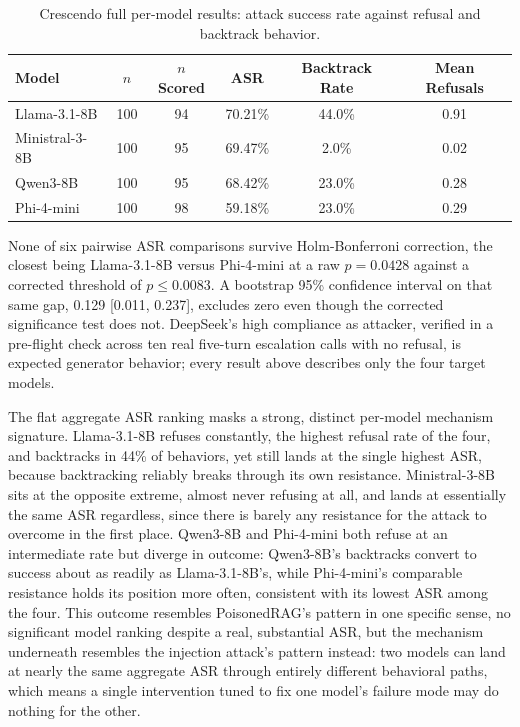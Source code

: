 \begin{table}[htbp]
\centering
\begin{tabular}{lccccc}
\toprule
\textbf{Model} & \textbf{$n$} & \textbf{$n$ Scored} & \textbf{ASR} & \textbf{Backtrack Rate} & \textbf{Mean Refusals} \\
\midrule
Llama-3.1-8B & 100 & 94 & 70.21\% & 44.0\% & 0.91 \\
Ministral-3-8B & 100 & 95 & 69.47\% & 2.0\% & 0.02 \\
Qwen3-8B & 100 & 95 & 68.42\% & 23.0\% & 0.28 \\
Phi-4-mini & 100 & 98 & 59.18\% & 23.0\% & 0.29 \\
\bottomrule
\end{tabular}
\caption{Crescendo full per-model results: attack success rate against refusal and backtrack behavior.}
\label{tab:crescendo-full}
\end{table}

None of six pairwise ASR comparisons survive Holm-Bonferroni correction,
the closest being Llama-3.1-8B versus Phi-4-mini at a raw $p=0.0428$
against a corrected threshold of $p\leq0.0083$. A bootstrap 95\%
confidence interval on that same gap, 0.129 [0.011, 0.237], excludes
zero even though the corrected significance test does not. DeepSeek's
high compliance as attacker, verified in a pre-flight check across ten
real five-turn escalation calls with no refusal, is expected generator
behavior; every result above describes only the four target models.

The flat aggregate ASR ranking masks a strong, distinct per-model
mechanism signature. Llama-3.1-8B refuses constantly, the highest
refusal rate of the four, and backtracks in 44\% of behaviors, yet still
lands at the single highest ASR, because backtracking reliably breaks
through its own resistance. Ministral-3-8B sits at the opposite extreme,
almost never refusing at all, and lands at essentially the same ASR
regardless, since there is barely any resistance for the attack to
overcome in the first place. Qwen3-8B and Phi-4-mini both refuse at an
intermediate rate but diverge in outcome: Qwen3-8B's backtracks convert
to success about as readily as Llama-3.1-8B's, while Phi-4-mini's
comparable resistance holds its position more often, consistent with
its lowest ASR among the four. This outcome resembles PoisonedRAG's
pattern in one specific sense, no significant model ranking despite a
real, substantial ASR, but the mechanism underneath resembles the
injection attack's pattern instead: two models can land at nearly the
same aggregate ASR through entirely different behavioral paths, which
means a single intervention tuned to fix one model's failure mode may
do nothing for the other.

